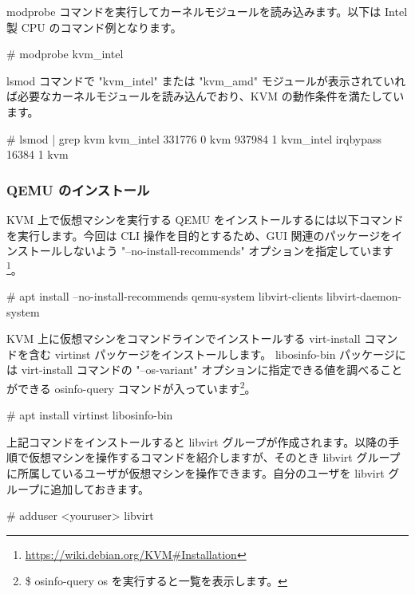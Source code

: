 \documentclass[mingoth,a4paper]{jsarticle}
\begin{document}
modprobe コマンドを実行してカーネルモジュールを読み込みます。以下は Intel 製 CPU のコマンド例となります。

\begin{commandline}
# modprobe kvm_intel
\end{commandline}

lsmod コマンドで "kvm\_intel" または "kvm\_amd" モジュールが表示されていれば必要なカーネルモジュールを読み込んでおり、KVM の動作条件を満たしています。

\begin{commandline}
# lsmod | grep kvm
kvm_intel             331776  0
kvm                   937984  1 kvm_intel
irqbypass              16384  1 kvm
\end{commandline}


\subsubsection{QEMU のインストール}

KVM 上で仮想マシンを実行する QEMU をインストールするには以下コマンドを実行します。今回は CLI 操作を目的とするため、GUI 関連のパッケージをインストールしないよう "--no-install-recommends" オプションを指定しています\footnote{\url{https://wiki.debian.org/KVM\#Installation}}。

\begin{commandline}
# apt install --no-install-recommends qemu-system libvirt-clients libvirt-daemon-system
\end{commandline}

KVM 上に仮想マシンをコマンドラインでインストールする virt-install コマンドを含む virtinst パッケージをインストールします。
libosinfo-bin パッケージには virt-install コマンドの "--os-variant" オプションに指定できる値を調べることができる osinfo-query コマンドが入っています\footnote{\$ osinfo-query os を実行すると一覧を表示します。}。

\begin{commandline}
# apt install virtinst libosinfo-bin
\end{commandline}

上記コマンドをインストールすると libvirt グループが作成されます。以降の手順で仮想マシンを操作するコマンドを紹介しますが、そのとき  libvirt グループ に所属しているユーザが仮想マシンを操作できます。自分のユーザを libvirt グループに追加しておきます。

\begin{commandline}
# adduser <youruser> libvirt
\end{commandline}
\end{document}
